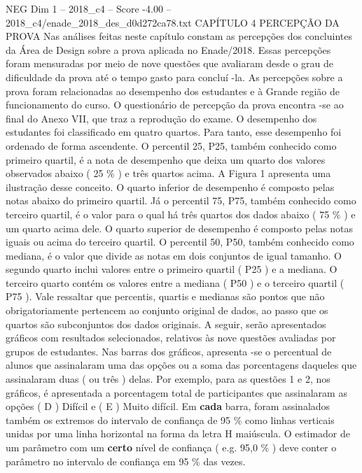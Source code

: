 \begin{textsample}{NEG Dim 1 – 2018\_c4 – Score -4.00 – 2018\_c4/enade\_2018\_des\_d0d272ca78.txt}  \label{ex:f1_neg_140}
CAPÍTULO 4 PERCEPÇÃO DA PROVA Nas análises feitas neste capítulo constam as percepções dos concluintes da Área de Design sobre a prova aplicada no Enade/2018.
Essas percepções foram mensuradas por meio de nove questões que avaliaram desde o grau de dificuldade da prova até o tempo gasto para concluí -la.
As percepções sobre a prova foram relacionadas ao desempenho dos estudantes e à Grande região de funcionamento do curso.
O questionário de percepção da prova encontra -se ao final do Anexo VII, que traz a reprodução do exame.
O desempenho dos estudantes foi classificado em quatro quartos.
Para tanto, esse desempenho foi ordenado de forma ascendente.
O percentil 25, P25, também conhecido como primeiro quartil, é a nota de desempenho que deixa um quarto dos valores observados abaixo ( 25 \% ) e três quartos acima.
A Figura 1 apresenta uma ilustração desse conceito.
O quarto inferior de desempenho é composto pelas notas abaixo do primeiro quartil.
Já o percentil 75, P75, também conhecido como terceiro quartil, é o valor para o qual há três quartos dos dados abaixo ( 75 \% ) e um quarto acima dele.
O quarto superior de desempenho é composto pelas notas iguais ou acima do terceiro quartil.
O percentil 50, P50, também conhecido como mediana, é o valor que divide as notas em dois conjuntos de igual tamanho.
O segundo quarto inclui valores entre o primeiro quartil ( P25 ) e a mediana.
O terceiro quarto contém os valores entre a mediana ( P50 ) e o terceiro quartil ( P75 ).
Vale ressaltar que percentis, quartis e medianas são pontos que não obrigatoriamente pertencem ao conjunto original de dados, ao passo que os quartos são subconjuntos dos dados originais.
A seguir, serão apresentados gráficos com resultados selecionados, relativos às nove questões avaliadas por grupos de estudantes.
Nas barras dos gráficos, apresenta -se o percentual de alunos que assinalaram uma das opções ou a soma das porcentagens daqueles que assinalaram duas ( ou três ) delas.
Por exemplo, para as questões 1 e 2, nos gráficos, é apresentada a porcentagem total de participantes que assinalaram as opções ( D ) Difícil e ( E ) Muito difícil.
Em \textbf{cada} barra, foram assinalados também os extremos do intervalo de confiança de 95 \% como linhas verticais unidas por uma linha horizontal na forma da letra H maiúscula.
O estimador de um parâmetro com um \textbf{certo} nível de confiança ( e.g. 95,0 \% ) deve conter o parâmetro no intervalo de confiança em 95 \% das vezes.

\end{textsample}
